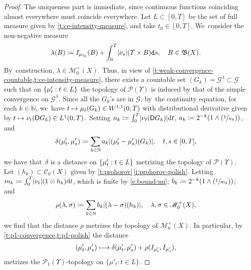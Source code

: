 \documentclass[JEP,XML,SOM,Unicode,published]{cedram}
\newcommand{\Psfrac}[2]{(\sfrac{#1}{#2})}
\newcommand\mto{\mathchoice{\longmapsto}{\mapsto}{\mapsto}{\mapsto}}
\theoremstyle{definition}
\theoremstyle{remark}
\DeclarePairedDelimiter{\paren}{\lparen}{\rparen}
\DeclarePairedDelimiter{\set}{\lbrace}{\rbrace}
\DeclarePairedDelimiter{\abs}{\lvert}{\rvert}
\begin{document}
\begin{proof}
The uniqueness part is immediate, since continuous functions coinciding almost everywhere must coincide everywhere.
Let $L \subset [0,T]$ be the set of full measure given by \cref{t:ce-intensity-measure}, and take $t_{0} \in [0,T]$. We~consider the non-negative measure
\begin{equation*}
\lambda(B) \coloneq I_{\mu_{t_{0}}}(B) + \int_{0}^{T} \abs{\nu_{s}}(\varUpsilon \times B) \mathtt{d} s, \quad B \in \mathfrak{B}(X).
\end{equation*}
By~construction, $\lambda \in \mathscr{M}_{0}^{+}(X)$.
Thus, in view of \cref{t:weak-convergence-countable,t:ce-intensity-measure}, there exists a countable set $(G_{k}) = \mathscr{G}^{\lambda} \subset \mathscr{G}$ such that on $\set{ \mu'_{t} : t \in L}$ the topology of $\mathscr{P}(\varUpsilon)$ is induced by that of the simple convergence on $\mathscr{G}^{\lambda}$.
Since all the $G_{k}$'s are in $\mathscr{G}$, by~the continuity equation, for each $k \in \mathbb{N}$, we~have $t\mto \mu_t(G_k)\in W^{1,1}(0,T)$ with distributional derivative given by $t \mto \nu_{t}(\mathsf{D} G_{k}) \in L^{1}(0,T)$.\
Setting $n_{k} \coloneq \int_{0}^{T} \abs{\nu_{t}(\mathsf{D}G_{k})} \mathrm{d} t$, $a_{k} \coloneq 2^{-k} \paren*{1 \wedge \Psfrac{1}{n_{k}}}$, and
\begin{equation*}
\delta(\mu'_{t}, \mu'_{s}) \coloneq \sum_{k \in \mathbb{N}} a_{k} \abs*{(\mu'_{t} - \mu'_{s})(G_{k})}, \quad t,s \in [0,T],
\end{equation*}
we have that~$\delta$ is a distance on $\set{ \mu'_{t}: t\in L}$ metrizing the topology of $\mathscr{P}(\varUpsilon)$.
Let $(h_{k}) \subset \mathscr{C}_{0}(X)$ given by \cref{t:prohorov}\,\cref{i:prohorov-polish}.
Letting $m_{k} \coloneq \int_{0}^{T} \abs{\nu_{t}}(1\otimes h_{k}) \mathrm{d} t$, which is finite by \cref{e:bound-nu}; $b_{k} \coloneq 2^{-k} (1 \wedge \Psfrac{1}{m_{k}})$; and
\begin{equation*}
\rho(\lambda, \sigma) \coloneq \sum_{k \in \mathbb{N}} b_{k} \abs{(\lambda - \sigma)(h_{k})}, \quad \lambda,\sigma \in \mathscr{M}_{0}^{+}(X),
\end{equation*}
we find that the distance $\rho$ metrizes the topology of $\mathscr{M}_{0}^{+}(X)$.
In particular, by \cref{t:p1-convergence,t:p1-polish} the distance
\begin{equation*}
(\mu'_{t}, \mu'_{s}) \mto \delta(\mu'_{t}, \mu'_{s}) + \rho(I_{\mu'_{t}}, I_{\mu'_{s}}),
\end{equation*}
metrizes the $\mathscr{P}_{1}(\varUpsilon)$-topology on $\{ \mu'_{t} : t \in L\}$.

\end{proof}
\end{document}
